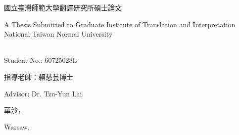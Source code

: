 \makeatletter
\begin{titlepage}%
  \begin{center}%
    {\large 國立臺灣師範大學翻譯研究所碩士論文\par}

    {\large A Thesis Submitted to Graduate Institute of Translation and Interpretation National Taiwan Normal University\par}
    \par
  \end{center}%
  \vspace{1cm plus 1fill}
  \begin{flushleft}%
    {{\Large\bfseries \@author}\\
      Student No.: 60725028L\par}
  \end{flushleft}%
  \vspace{8mm plus 1mm minus 2mm}
  \begin{center}%
    {\Large\textbf{\titlezh}\par}\par
    \vspace{1em}
    {\huge\textbf{\@title}\par}
    \vspace{2cm plus 1.5fill}
    {\large 指導老師：賴慈芸博士}\par
    \vspace{0.5em}
    {\large Advisor: Dr. Tzu-Yun Lai}\par
    \vspace{2cm}
    {\large 華沙，\zhtoday}\par
    \vspace{0.5em}
    {\large Warsaw, \@date}
  \end{center}
\end{titlepage}%
\makeatother
